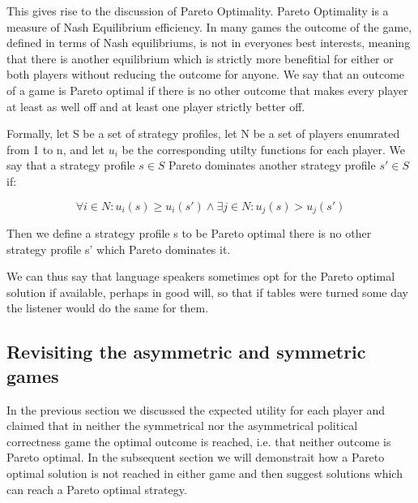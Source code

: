 \documentclass{article}
\begin{document}
This gives rise to the discussion of Pareto Optimality. Pareto Optimality is a measure of Nash Equilibrium efficiency. In many games the outcome of the game, defined in terms of Nash equilibriums, is not in everyones best interests, meaning that there is another equilibrium which is strictly more benefitial for either or both players without reducing the outcome for anyone. We say that an outcome of a game is Pareto optimal if there is no other outcome that makes every player at least as well off and at least one player strictly better off.

Formally, let S be a set of strategy profiles, let N be a set of players enumrated from 1 to n, and let $u_i$ be the corresponding utilty functions for each player. We say that a strategy profile $s \in S$ Pareto dominates another strategy profile $s' \in S$ if:

\begin{equation*}
\forall i \in N: u_i(s) \geq u_i(s') \land \exists j \in N: u_j(s) > u_j(s')
\end{equation*}

Then we define a strategy profile s to be Pareto optimal there is no other strategy profile s' which Pareto dominates it. %


We can thus say that language speakers sometimes opt for the Pareto optimal solution if available, perhaps in good will, so that if tables were turned some day the listener would do the same for them.

\subsection{Revisiting the asymmetric and symmetric games}
In the previous section we discussed the expected utility for each player and claimed that in neither the symmetrical nor the asymmetrical political correctness game the optimal outcome is reached, i.e. that neither outcome is Pareto optimal. In the subsequent section we will demonstrait how a Pareto optimal solution is not reached in either game and then suggest solutions which can reach a Pareto optimal strategy.
\end{document}
